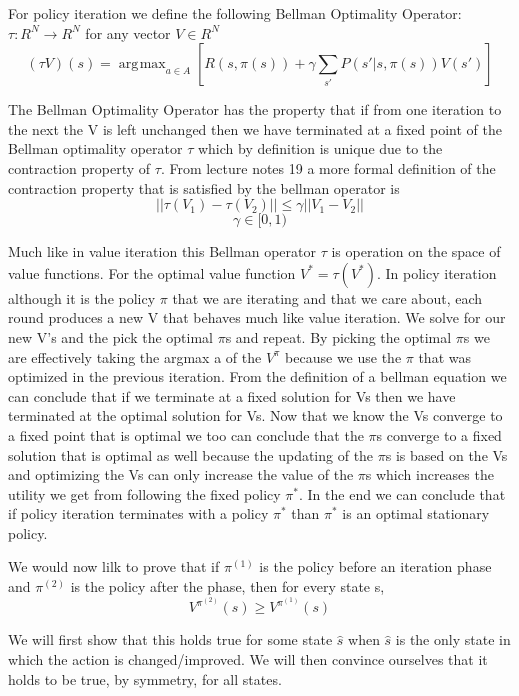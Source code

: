 \documentclass[solution, letterpaper]{cs121}
\DeclareMathOperator*{\argmax}{\arg\!\max}
\begin{document}
For policy iteration we define the following Bellman Optimality Operator: $\tau : R^N \rightarrow R^N$ for any vector $V \in R^N$
\[(\tau V)(s) = \argmax_{a \in A}  \left[ R(s,\pi(s) ) + \gamma \sum_{s'} P(s' | s,\pi(s))V(s')\right ]\]

The Bellman Optimality Operator has the property that if from one iteration to the next the V is left unchanged then we have terminated at a fixed point of the Bellman optimality operator $\tau$ which by definition is unique due to the contraction property of $\tau$.
From lecture notes 19 a more formal definition of the contraction property that is satisfied by the bellman operator is \[ ||\tau(V_1) - \tau(V_2) || \leq \gamma || V_1 - V_2 || \]   \[ \gamma \in [0,1)\]

Much like in value iteration this Bellman operator $\tau$ is operation on the space of value functions. For the optimal value function $V^* = \tau(V^*)$. In policy iteration although it is the policy $\pi$ that we are iterating and that we care about, each round produces a new V that behaves much like value iteration. We solve for our new V's and the pick the optimal $\pi$s and repeat. By picking the optimal $\pi$s we are effectively taking the argmax a of the $V^{\pi}$ because we use the $\pi$ that was optimized in the previous iteration. From the definition of a bellman equation we can conclude that if we terminate at a fixed solution for Vs then we have terminated at the optimal solution for Vs. Now that we know the Vs converge to a fixed point that is optimal we too can conclude that the $\pi$s converge to a fixed solution that is optimal as well because the updating of the $\pi$s is based on the Vs and optimizing the Vs can only increase the value of the $\pi$s which increases the utility we get from following the fixed policy $\pi^*$. In the end we can conclude that if policy iteration terminates with a policy $\pi^*$ than $\pi^*$ is an optimal stationary policy. 

\subproblem{} %
We would now lilk to prove that if $\pi^{(1)}$ is the policy before an iteration  phase and $\pi^{(2)}$ is the policy after the phase, then for every state s, 
\[ V^{\pi^{(2)}} (s) \ge V^{\pi^{(1)}}(s) \]

We will first show that this holds true for some state $\hat{s}$ when $\hat{s}$ is the only state in which the action is changed/improved. We will then convince ourselves that it holds to be true, by symmetry, for all states.  
\end{document}
